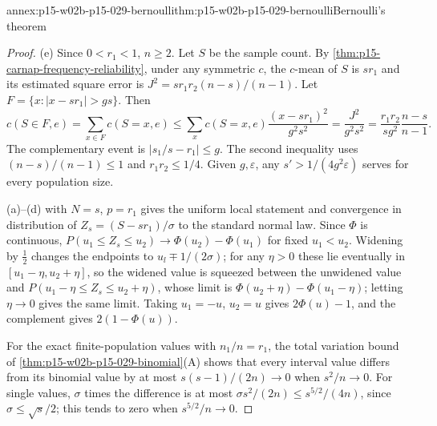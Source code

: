 \begin{annexitem}{annex:p15-w02b-p15-029-bernoulli}{thm:p15-w02b-p15-029-bernoulli}{Bernoulli's theorem}
\begin{proof}
(e) Since \(0<r_1<1\), \(n\geq2\). Let \(S\) be the sample count.
By \cref{thm:p15-carnap-frequency-reliability}, under any symmetric
\(c\), the \(c\)-mean of \(S\) is \(sr_1\) and its estimated square
error is \(J^2=sr_1r_2(n-s)/(n-1)\). Let
\(F=\{x:|x-sr_1|>gs\}\). Then
\[
 c(S\in F,e)=\sum_{x\in F}c(S=x,e)
 \leq\sum_x c(S=x,e)\frac{(x-sr_1)^2}{g^2s^2}
 =\frac{J^2}{g^2s^2}
 =\frac{r_1r_2}{sg^2}\frac{n-s}{n-1}.
\]
The complementary event is \(|s_1/s-r_1|\leq g\). The second inequality
uses \((n-s)/(n-1)\leq1\) and \(r_1r_2\leq1/4\). Given
\(g,\varepsilon\), any \(s'>1/(4g^2\varepsilon)\) serves for every
population size.

(a)--(d)  with \(N=s\),
\(p=r_1\) gives the uniform local statement and convergence in
distribution of \(Z_s=(S-sr_1)/\sigma\) to the standard normal law.
Since \(\Phi\) is continuous,
\(P(u_1\leq Z_s\leq u_2)\to\Phi(u_2)-\Phi(u_1)\) for fixed
\(u_1<u_2\). Widening by \(\tfrac12\) changes the endpoints to
\(u_l\mp1/(2\sigma)\); for any \(\eta>0\) these lie eventually in
\([u_1-\eta,u_2+\eta]\), so the widened value is squeezed between the
unwidened value and \(P(u_1-\eta\leq Z_s\leq u_2+\eta)\), whose limit
is \(\Phi(u_2+\eta)-\Phi(u_1-\eta)\); letting \(\eta\to0\) gives the
same limit. Taking \(u_1=-u\), \(u_2=u\) gives \(2\Phi(u)-1\), and
the complement gives \(2(1-\Phi(u))\).

For the exact finite-population values with \(n_1/n=r_1\), the total
variation bound of \cref{thm:p15-w02b-p15-029-binomial}(A) shows that
every interval value differs from its binomial value by at most
\(s(s-1)/(2n)\to0\) when \(s^2/n\to0\). For single values,
\(\sigma\) times the difference is at most
\(\sigma s^2/(2n)\leq s^{5/2}/(4n)\), since \(\sigma\leq\sqrt s/2\);
this tends to zero when \(s^{5/2}/n\to0\).
\end{proof}
\end{annexitem}


